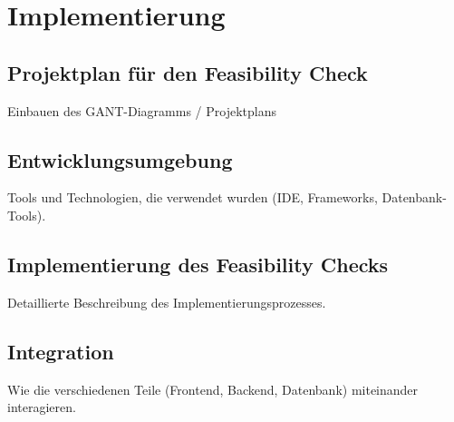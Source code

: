 \chapter{Implementierung}\label{Chap:Implementierung}

\section{Projektplan für den Feasibility Check}
Einbauen des GANT-Diagramms / Projektplans

\section{Entwicklungsumgebung}
Tools und Technologien, die verwendet wurden (IDE, Frameworks, Datenbank-Tools).
\section{Implementierung des Feasibility Checks}
Detaillierte Beschreibung des Implementierungsprozesses.
\section{Integration}
Wie die verschiedenen Teile (Frontend, Backend, Datenbank) miteinander interagieren.